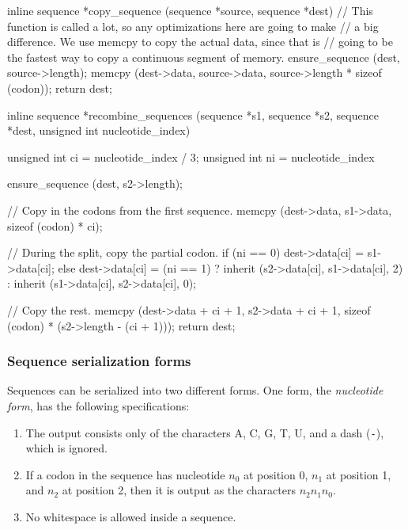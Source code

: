\documentclass{article}
\begin{document}
\begin{ccode}
inline sequence *copy_sequence (sequence *source, sequence *dest) {
  // This function is called a lot, so any optimizations here are going to make
  // a big difference. We use memcpy to copy the actual data, since that is
  // going to be the fastest way to copy a continuous segment of memory.
  ensure_sequence (dest, source->length);
  memcpy (dest->data, source->data, source->length * sizeof (codon));
  return dest;
}

inline sequence *recombine_sequences (sequence *s1, sequence *s2, sequence *dest,
				      unsigned int nucleotide_index) {
  unsigned int ci = nucleotide_index / 3;
  unsigned int ni = nucleotide_index %

  ensure_sequence (dest, s2->length);

  // Copy in the codons from the first sequence.
  memcpy (dest->data, s1->data, sizeof (codon) * ci);

  // During the split, copy the partial codon.
  if (ni == 0)
    dest->data[ci] = s1->data[ci];
  else
    dest->data[ci] = (ni == 1) ? inherit (s2->data[ci], s1->data[ci], 2) :
				 inherit (s1->data[ci], s2->data[ci], 0);

  // Copy the rest.
  memcpy (dest->data + ci + 1, s2->data + ci + 1, sizeof (codon) * (s2->length - (ci + 1)));
  return dest;
}
\end{ccode}

      \subsubsection{Sequence serialization forms}
	\label{sec:sequence-forms}

	Sequences can be serialized into two different forms. One form, the {\em
	nucleotide form}, has the following specifications:

	\begin{enumerate}
	  \item The output consists only of the characters A, C, G, T, U, and
	  a dash (\verb|-|), which is ignored.

	  \item If a codon in the sequence has nucleotide $n_0$ at position 0,
	  $n_1$ at position 1, and $n_2$ at position 2, then it is output as the
	  characters $n_2 n_1 n_0$.

	  \item No whitespace is allowed inside a sequence.
	\end{enumerate}
\end{document}
